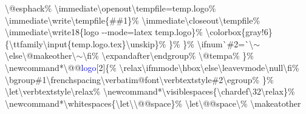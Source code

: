 \begin{linenumbers}
\hspace*{3.6em}\textbackslash @esphack\%\newline
\hspace*{3.6em}\textbackslash immediate\textbackslash openout\textbackslash tempf{}ile=temp.logo\%\newline
\hspace*{3.6em}\textbackslash immediate\textbackslash write\textbackslash tempf{}ile\{\#\#1\}\%\newline
\hspace*{3.6em}\textbackslash immediate\textbackslash closeout\textbackslash tempf{}ile\%\newline
\hspace*{3.6em}\textbackslash immediate\textbackslash write18\{logo -{}-mode=latex temp.logo\}\%\newline
\hspace*{3.6em}\textbackslash colorbox\{gray!6\}\{\textbackslash ttfamily\textbackslash input\{temp.logo.tex\}\textbackslash unskip\}\%\newline
\hspace*{2.4em}\}\%\newline
\hspace*{1.2em}\}\%\newline
\hspace*{1.2em}\textbackslash ifnum\`{}\#2=\`{}\textbackslash $\sim$\textbackslash else\textbackslash @makeother\textbackslash $\sim$\textbackslash f{}i\%\newline
\hspace*{1.2em}\textbackslash expandafter\textbackslash endgroup\%\newline
\hspace*{1.2em}\textbackslash @tempa\%\newline
\}\%\newline
\textbackslash newcommand*\textbackslash @@\textcolor{blue}{logo}[2]\{\%\newline
\hspace*{1.2em}\textbackslash relax\textbackslash ifmmode\textbackslash hbox\textbackslash else\textbackslash leavevmode\textbackslash null\textbackslash f{}i\%\newline
\hspace*{1.2em}\textbackslash bgroup\#1\textbackslash frenchspacing\textbackslash verbatim@font\textbackslash verbtextstyle\#2\textbackslash egroup\%\newline
\}\%\newline
\textbackslash let\textbackslash verbtextstyle\textbackslash relax\%\newline
\textbackslash newcommand*\textbackslash visiblespaces\{\textbackslash chardef\textbackslash  32\textbackslash relax\}\%\newline
\textbackslash newcommand*\textbackslash whitespaces\{\textbackslash let\textbackslash  \textbackslash @@space\}\%\newline
\textbackslash let\textbackslash @@space\textbackslash\textvisiblespace\%\newline
\textbackslash makeatother
\end{linenumbers}

